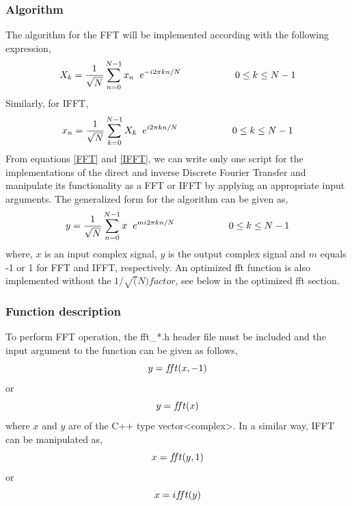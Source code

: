 \subsubsection{Algorithm}
The algorithm for the FFT will be implemented according with the following expression,
\begin{equation}
X_k =\dfrac{1}{\sqrt{N}}\sum\limits_{n=0}^{N-1} x_n \hspace{2mm} e^{-i2\pi kn/N}		\hspace{2cm}	0\leq k \leq N-1
\label{FFT}
\end{equation}
Similarly, for IFFT,
\begin{equation}
x_n =\frac{1}{\sqrt{N}} \sum\limits_{k=0}^{N-1} X_k \hspace{2mm}  e^{i2\pi kn/N}		\hspace{2cm}	0\leq k \leq N-1
\label{IFFT}
\end{equation}
From equations \ref{FFT} and \ref{IFFT}, we can write only one script for the implementations of the direct and inverse Discrete Fourier Transfer and manipulate its functionality as a FFT or IFFT by applying an appropriate input arguments. The generalized form for the algorithm can be given as,
\begin{equation}
y =\frac{1}{\sqrt{N}} \sum\limits_{n=0}^{N-1} x \hspace{2mm}  e^{m  i2\pi kn/N}		\hspace{2cm}	0\leq k \leq N-1
\label{FT}
\end{equation}
where, $x$ is an input complex signal, $y$ is the output complex signal and $m$ equals -1 or 1 for FFT and IFFT, respectively. An optimized fft function is also implemented without the $1/\sqrt(N) factor$, see below in the optimized fft section.

\subsubsection{Function description}
To perform FFT operation, the fft\_*.h header file must be included and the input argument to the function can be given as follows,
\begin{equation*}
y=f\hspace{-0.85mm}ft(x,-1)
\end{equation*}
or
\begin{equation*}
	y = f\hspace{-0.85mm}ft(x)
\end{equation*}
where $x$ and $y$ are of the C++ type vector<complex>. In a similar way, IFFT can be manipulated as,
\begin{equation*}
x = f\hspace{-0.85mm}ft(y,1)
\end{equation*}
or
\begin{equation*}
	x = if\hspace{-0.85mm}ft(y)
\end{equation*}

